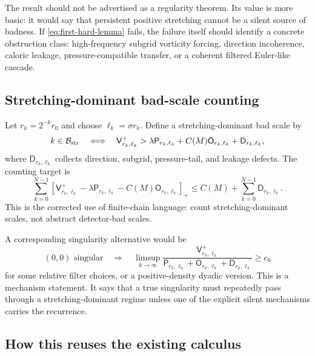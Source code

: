 \documentclass[11pt]{article}
\numberwithin{equation}{section}
\theoremstyle{remark}
\newcommand{\calB}{\mathcal B}
\begin{document}
The result should not be advertised as a regularity theorem. Its value is more basic: it would say that persistent positive stretching cannot be a silent source of badness. If \eqref{eq:first-hard-lemma} fails, the failure itself should identify a concrete obstruction class: high-frequency subgrid vorticity forcing, direction incoherence, caloric leakage, pressure-compatible transfer, or a coherent filtered Euler-like cascade.

\subsection{Stretching-dominant bad-scale counting}

Let $r_k=2^{-k}r_0$ and choose $\ell_k=\sigma r_k$. Define a stretching-dominant bad scale by
\begin{equation}\label{eq:stretching-bad-scale}
k\in\calB_{\rm str}
\quad\Longleftrightarrow\quad
\mathsf V^+_{r_k,\ell_k}
>
\lambda\mathsf P_{r_k,\ell_k}
+C(M)\mathsf O_{r_k,\ell_k}
+\mathsf D_{r_k,\ell_k},
\end{equation}
where $\mathsf D_{r_k,\ell_k}$ collects direction, subgrid, pressure-tail, and leakage defects.
The counting target is
\begin{equation}\label{eq:stretching-counting-target}
\sum_{k=0}^{N-1}
\left[
\mathsf V^+_{r_k,\ell_k}
-
\lambda\mathsf P_{r_k,\ell_k}
-
C(M)\mathsf O_{r_k,\ell_k}
\right]_+
\le
C(M)+
\sum_{k=0}^{N-1}\mathsf D_{r_k,\ell_k}.
\end{equation}
This is the corrected use of finite-chain language: count stretching-dominant scales, not abstract detector-bad scales.

A corresponding singularity alternative would be
\begin{equation}\label{eq:stretching-necessary-alternative}
(0,0)\text{ singular}
\quad\Longrightarrow\quad
\limsup_{k\to\infty}
\frac{\mathsf V^+_{r_k,\ell_k}}
{\mathsf P_{r_k,\ell_k}+\mathsf O_{r_k,\ell_k}+\mathsf D_{r_k,\ell_k}}
\ge c_0
\end{equation}
for some relative filter choices, or a positive-density dyadic version. This is a mechanism statement. It says that a true singularity must repeatedly pass through a stretching-dominant regime unless one of the explicit silent mechanisms carries the recurrence.

\subsection{How this reuses the existing calculus}
\end{document}
